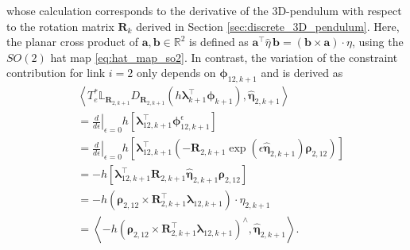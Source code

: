 whose calculation corresponds to the derivative of the 3D-pendulum with respect to the rotation matrix $\bm{R}_k$ derived in Section \ref{sec:discrete_3D_pendulum}.
Here, the planar cross product of $\boldsymbol{a},\boldsymbol{b}\in\mathbb{R}^{2}$ is defined as
$\boldsymbol{a}^{\top}\widehat{\eta}\,\boldsymbol{b}=(\boldsymbol{b}\times\boldsymbol{a}) \cdot \eta$, using the $SO(2)$ hat map \eqref{eq:hat_map_so2}.
In contrast, the variation of the constraint contribution for link $i=2$ only depends on $\bm{\phi}_{12,k+1}$ and is derived as
\begin{equation}
    \begin{aligned}
    &
    \left\langle
    T_e^*\mathbb{L}_{\bm{R}_{2,k+1}}
    D_{\bm{R}_{2,k+1}}
    \left(
    h\bm{\lambda}_{k+1}^{\top}\bm{\phi}_{k+1}
    \right),
    \bm{\widehat{\eta}}_{2,k+1}
    \right\rangle
    \\
    &=
    \left.
    \frac{d}{d\epsilon}
    \right|_{\epsilon=0}
    h
    \left[
    \bm{\lambda}_{12,k+1}^{\top}
    \bm{\phi}_{12,k+1}^{\epsilon}
    \right]
    \\
    &=
    \left.
    \frac{d}{d\epsilon}
    \right|_{\epsilon=0}
    h
    \left[
    \bm{\lambda}_{12,k+1}^{\top}
    \left(
    -
    \bm{R}_{2,k+1}
    \exp(\epsilon\bm{\widehat{\eta}}_{2,k+1})
    \bm{\rho}_{2,12}
    \right)
    \right]
    \\
    &=
    -h
    \left[
    \bm{\lambda}_{12,k+1}^{\top}
    \bm{R}_{2,k+1}
    \bm{\widehat{\eta}}_{2,k+1}
    \bm{\rho}_{2,12}
    \right]
    \\
    &=
    -h
    \left(
    \bm{\rho}_{2,12}
    \times
    \bm{R}_{2,k+1}^{\top}\bm{\lambda}_{12,k+1}
    \right)
    \cdot
    \eta_{2,k+1}
    \\
    &=
    \left\langle
    -h
    \left(
    \bm{\rho}_{2,12}
    \times
    \bm{R}_{2,k+1}^{\top}\bm{\lambda}_{12,k+1}
    \right)^{\wedge},
    \bm{\widehat{\eta}}_{2,k+1}
    \right\rangle .
    \end{aligned}
    \label{eq:acrobot_R2_constraint_derivative_kp1}
\end{equation}

